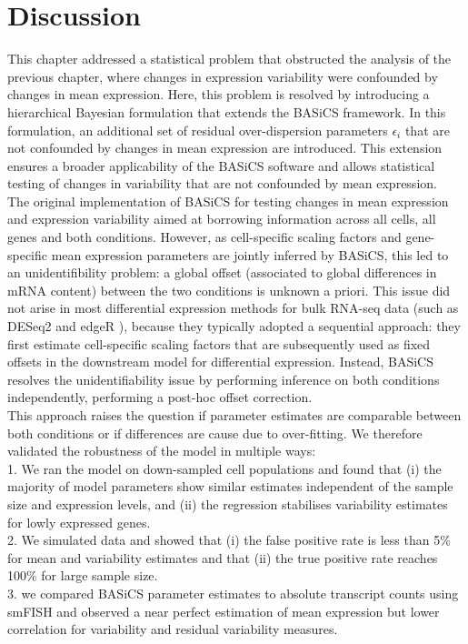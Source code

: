 
\section{Discussion}

This chapter addressed a statistical problem that obstructed the analysis of the previous chapter, where changes in expression variability were confounded by changes in mean expression. 
Here, this problem is resolved by introducing a hierarchical Bayesian formulation that extends the BASiCS framework. 
In this formulation, an additional set of residual over-dispersion parameters $\epsilon_i$ that are not confounded by changes in mean expression are introduced. 
This extension ensures a broader applicability of the BASiCS software and allows statistical testing of changes in variability that are not confounded by mean expression.  \\ 

The original implementation of BASiCS for testing changes in mean expression and expression variability aimed at borrowing information across all cells, all genes and both conditions.
However, as cell-specific scaling factors and gene-specific mean expression parameters are jointly inferred by BASiCS, this led to an unidentifibility problem: a global offset (associated to global differences in mRNA content) between the two conditions is unknown a priori. 
This issue did not arise in most differential expression methods for bulk RNA-seq data (such as DESeq2 \cite{Love2014} and edgeR \cite{Robinson2009}), because they typically adopted a sequential approach: they first estimate cell-specific scaling factors that are subsequently used as fixed offsets in the downstream model for differential expression. 
Instead, BASiCS resolves the unidentifiability issue by performing inference on both conditions independently, performing a post-hoc offset correction.\\
This approach raises the question if parameter estimates are comparable between both conditions or if differences are cause due to over-fitting.
We therefore validated the robustness of the model in multiple ways:\\

1. We ran the model on down-sampled cell populations and found that (i) the majority of model parameters show similar estimates independent of the sample size and expression levels, and (ii) the regression stabilises variability estimates for lowly expressed genes. \\
2. We simulated data and showed that (i) the false positive rate is less than 5\% for mean and variability estimates and that (ii) the true positive rate reaches 100\% for large sample size. \\
3. we compared BASiCS parameter estimates to absolute transcript counts using smFISH and observed a near perfect estimation of mean expression but lower correlation for variability and residual variability measures.

